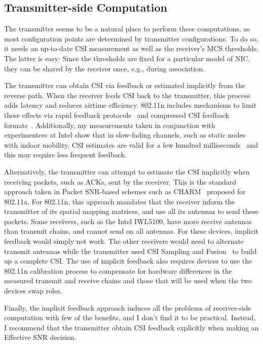 \subsection{Transmitter-side Computation}
The transmitter seems to be a natural place to perform these computations, as most configuration points are determined by transmitter configurations. To do so, it needs an up-to-date CSI measurement as well as the receiver's MCS thresholds. The latter is easy: Since the thresholds are fixed for a particular model of NIC, they can be shared by the receiver once, e.g., during association.

The transmitter can obtain CSI via feedback or estimated implicitly from the reverse path. When the receiver feeds CSI back to the transmitter, this process adds latency and reduces airtime efficiency. 802.11n includes mechanisms to limit these effects via rapid feedback protocols~\cite[\S9.19.2]{80211n} and compressed CSI feedback formats~\cite[\S20.3.12.2.5]{80211n}. Additionally, my measurements taken in conjunction with experimenters at Intel show that in slow-fading channels, such as static nodes with indoor mobility, CSI estimates are valid for a few hundred milliseconds~\cite{Perahia_Doppler} and this may require less frequent feedback.

Alternatively, the transmitter can attempt to estimate the CSI implicitly when receiving packets, such as ACKs, sent by the receiver. This is the standard approach taken in Packet SNR-based schemes such as CHARM~\cite{Judd_CHARM} proposed for 802.11a. For 802.11n, this approach mandates that the receiver inform the transmitter of its spatial mapping matrices, and use all its antennas to send these packets. Some receivers, such as the Intel IWL5100, have more receive antennas than transmit chains, and cannot send on all antennas. For these devices, implicit feedback would simply not work. The other receivers would need to alternate transmit antennas while the transmitter used CSI Sampling and Fusion~\cite{Crepaldi_CSI_SF} to build up a complete CSI. The use of implicit feedback also requires devices to use the 802.11n calibration process to compensate for hardware differences in the measured transmit and receive chains and those that will be used when the two devices swap roles.

Finally, the implicit feedback approach induces all the problems of receiver-side computation with few of the benefits, and I don't find it to be practical. Instead, I recommend that the transmitter obtain CSI feedback explicitly when making an Effective SNR decision.

